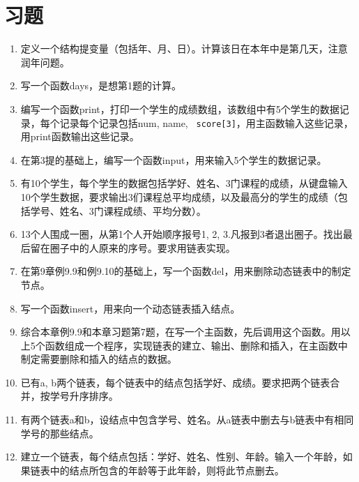 \section{习题}
\begin{enumerate}
	\item 定义一个结构提变量（包括年、月、日）。计算该日在本年中是第几天，注意润年问题。
	\item 写一个函数days，是想第1题的计算。
	\item 编写一个函数print，打印一个学生的成绩数组，该数组中有5个学生的数据记录，每个记录每个记录包括num, name, \verb| score[3]|，用主函数输入这些记录，用print函数输出这些记录。
	\item 在第3提的基础上，编写一个函数input，用来输入5个学生的数据记录。
	\item 有10个学生，每个学生的数据包括学好、姓名、3门课程的成绩，从键盘输入10个学生数据，要求输出3们课程总平均成绩，以及最高分的学生的成绩（包括学号、姓名、3门课程成绩、平均分数）。
	\item 13个人围成一圈，从第1个人开始顺序报号1, 2, 3.凡报到3者退出圈子。找出最后留在圈子中的人原来的序号。要求用链表实现。
	\item 在第9章例9.9和例9.10的基础上，写一个函数del，用来删除动态链表中的制定节点。
	\item 写一个函数insert，用来向一个动态链表插入结点。
	\item 综合本章例9.9和本章习题第7题，在写一个主函数，先后调用这个函数。用以上5个函数组成一个程序，实现链表的建立、输出、删除和插入，在主函数中制定需要删除和插入的结点的数据。
	\item 已有a, b两个链表，每个链表中的结点包括学好、成绩。要求把两个链表合并，按学号升序排序。
	\item 有两个链表a和b，设结点中包含学号、姓名。从a链表中删去与b链表中有相同学号的那些结点。
	\item 建立一个链表，每个结点包括：学好、姓名、性别、年龄。输入一个年龄，如果链表中的结点所包含的年龄等于此年龄，则将此节点删去。
\end{enumerate}
